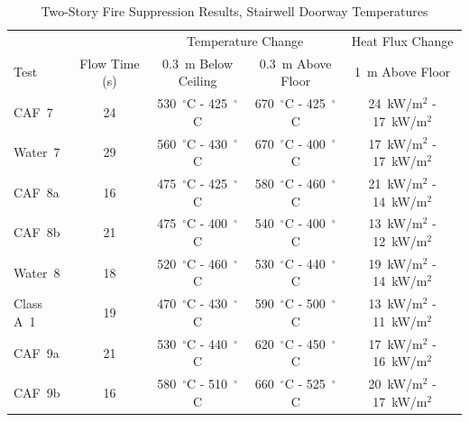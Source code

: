 \documentclass[12pt,oneside]{book}
\begin{document}
\begin{table}[!ht]
\centering
\caption{Two-Story Fire Suppression Results, Stairwell Doorway Temperatures}\label{tab:Test_Results_2}
\begin{tabular}{lcccc}
\toprule[1.5pt]
           &               & \multicolumn{2}{c}{Temperature Change}                                    & Heat Flux Change \\
Test 	   & Flow Time (s) & 0.3~m Below Ceiling                 & 0.3~m Above Floor	               & 1~m Above Floor \\
\midrule
CAF~7      & 24            & 530~$^{\circ}$C - 425~$^{\circ}$C   & 670~$^{\circ}$C - 425~$^{\circ}$C   & 24~kW/m$^2$ - 17~kW/m$^2$  \\[.25cm]
Water~7    & 29            & 560~$^{\circ}$C - 430~$^{\circ}$C   & 670~$^{\circ}$C - 400~$^{\circ}$C   & 17~kW/m$^2$ - 17~kW/m$^2$  \\[.25cm]
CAF~8a     & 16            & 475~$^{\circ}$C - 425~$^{\circ}$C   & 580~$^{\circ}$C - 460~$^{\circ}$C   & 21~kW/m$^2$ - 14~kW/m$^2$  \\
CAF~8b     & 21            & 475~$^{\circ}$C - 400~$^{\circ}$C   & 540~$^{\circ}$C - 400~$^{\circ}$C   & 13~kW/m$^2$ - 12~kW/m$^2$  \\[.25cm]
Water~8    & 18            & 520~$^{\circ}$C - 460~$^{\circ}$C   & 530~$^{\circ}$C - 440~$^{\circ}$C   & 19~kW/m$^2$ - 14~kW/m$^2$  \\[.25cm]
Class A~1  & 19            & 470~$^{\circ}$C - 430~$^{\circ}$C   & 590~$^{\circ}$C - 500~$^{\circ}$C   & 13~kW/m$^2$ - 11~kW/m$^2$  \\
CAF~9a     & 21            & 530~$^{\circ}$C - 440~$^{\circ}$C   & 620~$^{\circ}$C - 450~$^{\circ}$C   & 17~kW/m$^2$ - 16~kW/m$^2$  \\
CAF~9b     & 16            & 580~$^{\circ}$C - 510~$^{\circ}$C   & 660~$^{\circ}$C - 525~$^{\circ}$C   & 20~kW/m$^2$ - 17~kW/m$^2$  \\
\bottomrule[1.25pt]
\end{tabular}\par
\end{table}
\end{document}
